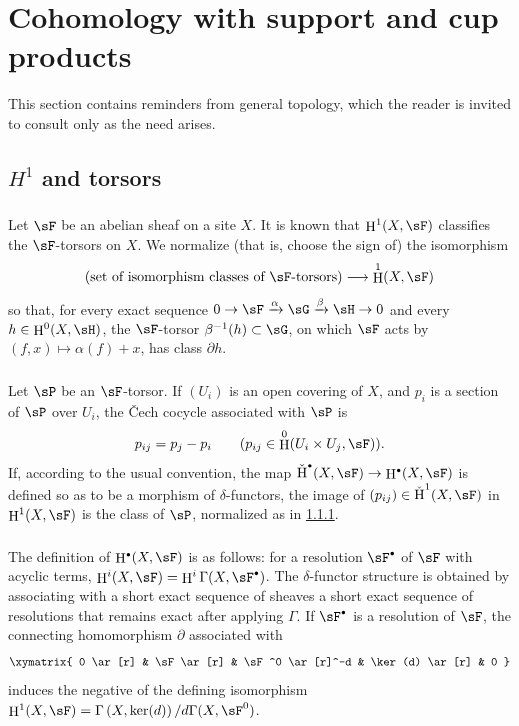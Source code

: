 \documentclass[12pt,oneside,english]{smfbook}
\DeclareMathOperator{\h}{H}
\let\oldbullet\bullet
\renewcommand{\bullet}{\textnormal{\tiny$\oldbullet$}}
\begin{document}
\section{Cohomology with support and cup products}\label{IV:1}

This section contains reminders from general topology, which the reader is invited to consult only as the need arises.

\subsection{\texorpdfstring{$H^1$}{H1} and torsors}\label{IV:1-1}

\subsubsection{}\label{IV:1-1-1}

Let $\sF$ be an abelian sheaf on a site $X$. It is known that $\h^1(X,\sF)$ classifies the $\sF$-torsors on $X$. We normalize (that is, choose the sign of) the isomorphism
\[
  (\text{set of isomorphism classes of $\sF$-torsors})
  \longrightarrow\h^1(X,\sF)
\]
so that, for every exact sequence $0\to\sF\xrightarrow\alpha\sG\xrightarrow\beta\sH\to0$ and every $h\in\h^0(X,\sH)$, the $\sF$-torsor $\beta^{-1}(h)\subset\sG$, on which $\sF$ acts by $(f,x)\mapsto\alpha(f)+x$, has class $\partial h$.

\subsubsection{}\label{IV:1-1-2}

Let $\sP$ be an $\sF$-torsor. If $(U_i)$ is an open covering of $X$, and $p_i$ is a section of $\sP$ over $U_i$, the \v{C}ech cocycle associated with $\sP$ is
\[
  p_{i j} = p_j - p_i \qquad \text{($p_{i j}\in \h^0(U_i\times U_j,\sF)$).}
\]
If, according to the usual convention, the map $\operatorname{\check H}^\bullet(X,\sF)\to\h^\bullet(X,\sF)$ is defined so as to be a morphism of $\delta$-functors, the image of $(p_{ij})\in\operatorname{\check H}^1(X,\sF)$ in $\h^1(X,\sF)$ is the class of $\sP$, normalized as in \ref{IV:1-1-1}.

\subsubsection{}\label{IV:1-1-3}

The definition of $\h^\bullet(X,\sF)$ is as follows: for a resolution $\sF^\bullet$ of $\sF$ with acyclic terms, $\h^i(X,\sF)=\h^i\Gamma(X,\sF^\bullet)$. The $\delta$-functor structure is obtained by associating with a short exact sequence of sheaves a short exact sequence of resolutions that remains exact after applying $\Gamma$. If $\sF^\bullet$ is a resolution of $\sF$, the connecting homomorphism $\partial$ associated with
\[\xymatrix{
  0 \ar[r]
    & \sF \ar[r]
    & \sF^0 \ar[r]^-d
    & \ker(d) \ar[r]
    & 0
}\]
induces the negative of the defining isomorphism $\h^1(X,\sF) = \Gamma\left(X,\ker(d)\right)/d \Gamma(X,\sF^0)$.
\end{document}
